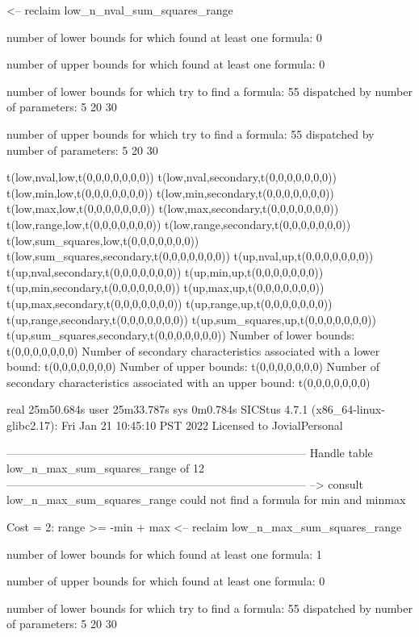 <-- reclaim low_n_nval_sum_squares_range

number of lower bounds for which found at least one formula: 0

number of upper bounds for which found at least one formula: 0

number of lower bounds for which try to find a formula: 55
dispatched by number of parameters: 5  20  30

number of upper bounds for which try to find a formula: 55
dispatched by number of parameters: 5  20  30

t(low,nval,low,t(0,0,0,0,0,0,0))
t(low,nval,secondary,t(0,0,0,0,0,0,0))
t(low,min,low,t(0,0,0,0,0,0,0))
t(low,min,secondary,t(0,0,0,0,0,0,0))
t(low,max,low,t(0,0,0,0,0,0,0))
t(low,max,secondary,t(0,0,0,0,0,0,0))
t(low,range,low,t(0,0,0,0,0,0,0))
t(low,range,secondary,t(0,0,0,0,0,0,0))
t(low,sum_squares,low,t(0,0,0,0,0,0,0))
t(low,sum_squares,secondary,t(0,0,0,0,0,0,0))
t(up,nval,up,t(0,0,0,0,0,0,0))
t(up,nval,secondary,t(0,0,0,0,0,0,0))
t(up,min,up,t(0,0,0,0,0,0,0))
t(up,min,secondary,t(0,0,0,0,0,0,0))
t(up,max,up,t(0,0,0,0,0,0,0))
t(up,max,secondary,t(0,0,0,0,0,0,0))
t(up,range,up,t(0,0,0,0,0,0,0))
t(up,range,secondary,t(0,0,0,0,0,0,0))
t(up,sum_squares,up,t(0,0,0,0,0,0,0))
t(up,sum_squares,secondary,t(0,0,0,0,0,0,0))
Number of lower bounds:                                             t(0,0,0,0,0,0,0)
Number of secondary characteristics associated with a lower bound:  t(0,0,0,0,0,0,0)
Number of upper bounds:                                             t(0,0,0,0,0,0,0)
Number of secondary characteristics associated with an upper bound: t(0,0,0,0,0,0,0)

real	25m50.684s
user	25m33.787s
sys	0m0.784s
SICStus 4.7.1 (x86_64-linux-glibc2.17): Fri Jan 21 10:45:10 PST 2022
Licensed to JovialPersonal


--------------------------------------------------------------------------------
Handle table low_n_max_sum_squares_range of 12
--------------------------------------------------------------------------------
--> consult low_n_max_sum_squares_range
could not find a formula for min and minmax

Cost =  2:  range >= -min + max
<-- reclaim low_n_max_sum_squares_range

number of lower bounds for which found at least one formula: 1

number of upper bounds for which found at least one formula: 0

number of lower bounds for which try to find a formula: 55
dispatched by number of parameters: 5  20  30

